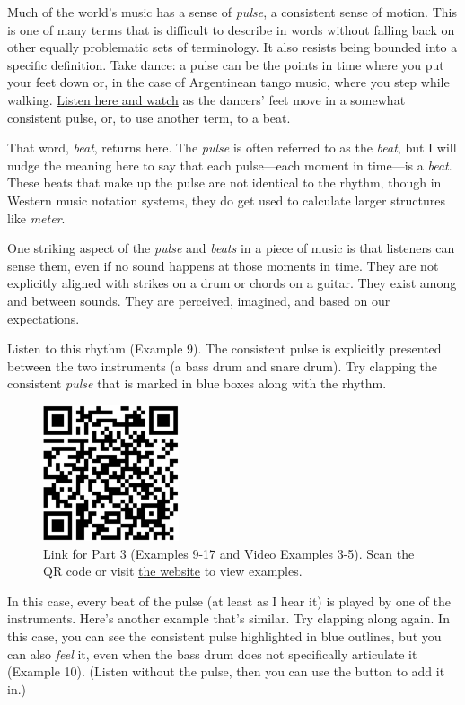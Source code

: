 \documentclass[twoside]{article}
\providecommand{\wmturlcaption}{
  Scan the QR code or visit \href{https://worldmusictextbook.org/witulski-2021}{the website} to view examples.
}
\begin{document}
Much of the world's music has a sense of \emph{pulse}, a consistent
sense of motion. This is one of many terms that is difficult to describe
in words without falling back on other equally problematic sets of
terminology. It also resists being bounded into a specific definition.
Take dance: a pulse can be the points in time where you put your feet
down or, in the case of Argentinean tango music, where you step while
walking. \href{https://www.youtube.com/embed/wIvfPI_GT3U}{Listen here
and watch} as the dancers' feet move in a somewhat consistent pulse, or,
to use another term, to a beat.

That word, \emph{beat}, returns here. The \emph{pulse} is often referred
to as the \emph{beat}, but I will nudge the meaning here to say that
each pulse---each moment in time---is a \emph{beat}. These beats that
make up the pulse are not identical to the rhythm, though in Western
music notation systems, they do get used to calculate larger structures
like \emph{meter}.

One striking aspect of the \emph{pulse} and \emph{beats} in a piece of
music is that listeners can sense them, even if no sound happens at
those moments in time. They are not explicitly aligned with strikes on a
drum or chords on a guitar. They exist among and between sounds. They
are perceived, imagined, and based on our expectations.

Listen to this rhythm (Example 9). The consistent pulse is explicitly presented
between the two instruments (a bass drum and snare drum). Try clapping
the consistent \emph{pulse} that is marked in blue boxes along with the
rhythm.

\begin{figure}
  \centering
  \includegraphics[height=4cm]{witulski-rhythm-part-3.png}
  \caption*{Link for Part 3 (Examples 9-17 and Video Examples 3-5). \wmturlcaption}
\end{figure}

In this case, every beat of the pulse (at least as I hear it) is played
by one of the instruments. Here's another example that's similar. Try
clapping along again. In this case, you can see the consistent pulse
highlighted in blue outlines, but you can also \emph{feel} it, even when
the bass drum does not specifically articulate it (Example 10). (Listen without the
pulse, then you can use the button to add it in.)
\end{document}
